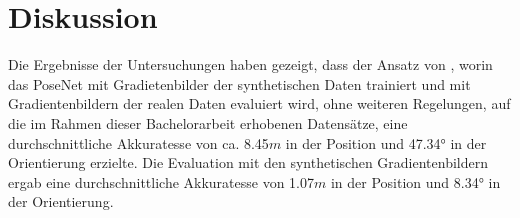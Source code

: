 
\section{Diskussion}
\label{sec:kapitel_5}
Die Ergebnisse der Untersuchungen haben gezeigt, dass der Ansatz von \citet{acharyaBIMPoseNetIndoorCamera2019}, worin das PoseNet mit Gradietenbilder der synthetischen Daten trainiert und mit Gradientenbildern der realen Daten evaluiert wird, ohne weiteren Regelungen, auf die im Rahmen dieser Bachelorarbeit erhobenen Datensätze, eine durchschnittliche Akkuratesse von ca. 8.45$m$ in der Position und 47.34° in der Orientierung erzielte. Die Evaluation mit den synthetischen Gradientenbildern ergab eine durchschnittliche Akkuratesse von 1.07$m$ in der Position und 8.34° in der Orientierung.